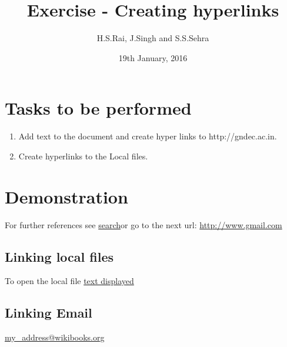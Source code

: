 \documentclass[a4paper,12pt,twoside]{article}
\title{Exercise - Creating hyperlinks}
\author{H.S.Rai, J.Singh and S.S.Sehra}
\date{19th January, 2016}
\begin{document}
	\maketitle	
\section*{Tasks to be performed}
\begin{enumerate}	
\item Add text to the document and create hyper links to http://gndec.ac.in.
\item Create hyperlinks to the Local files.
\end{enumerate}
	
\section*{Demonstration}
For further references see \href{http://www.google.com}{search}or go to the next url: \url{http://www.gmail.com} 

\subsection*{Linking local files}
To open the local file \href{run:file.txt}{text displayed}
\subsection{Linking Email}
\href{mailto:my_address@wikibooks.org}{my\_address@wikibooks.org}
		
 
\end{document}
